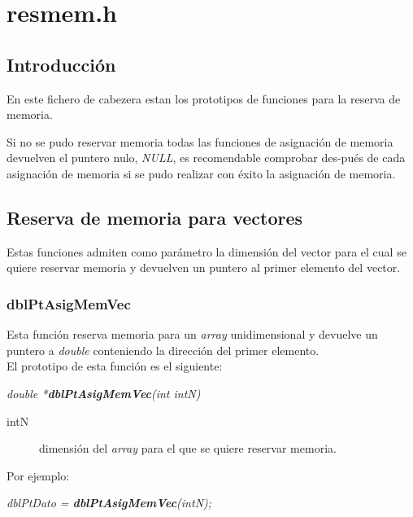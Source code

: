 %
%

\chapter{resmem.h}

\section{Introducci\'on}
En este fichero de cabezera estan los prototipos de funciones para la
reserva de memoria.\newline
\par Si no se pudo reservar memoria todas las funciones de asignaci\'on de 
memoria devuelven el puntero nulo, \emph{NULL}, es recomendable comprobar
des-pu\'es de cada asignaci\'on de memoria si se pudo realizar con \'exito la
asignaci\'on de memoria.

\section{Reserva de memoria para vectores}
Estas funciones admiten como par\'ametro la dimensi\'on del vector para el
cual se quiere reservar memoria y devuelven un puntero al primer elemento del
vector.

\newpage

\subsection{dblPtAsigMemVec} \label{sec:AsigMemVec}
Esta funci\'on reserva memoria para un \emph{array} unidimensional y devuelve 
un puntero a \emph{double} conteniendo la direcci\'on del primer elemento.\\

El prototipo de esta funci\'on es el siguiente:

\begin{center}
\emph{double *\textbf{dblPtAsigMemVec}(int intN)}
\end{center}

\begin{description}
\item[intN] dimensi\'on del \emph{array} para el que se quiere reservar
memoria.
\end{description}

Por ejemplo: 

\begin{center}
\emph{dblPtDato = \textbf{dblPtAsigMemVec}(intN);}
\end{center}

